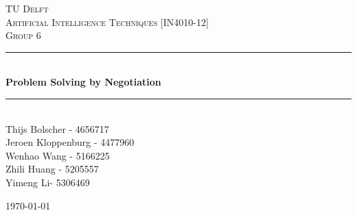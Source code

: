 \documentclass{article}
\newcommand{\divider}{\rule{\linewidth}{0.5mm}}
\begin{document}
    \begin{titlepage}
        \vfill
    
        \begin{center}
    		\textsc{\LARGE TU Delft}\\[1.5cm]
    		\textsc{\Large Artificial Intelligence Techniques [IN4010-12]}\\[0.5cm]
    		\textsc{\large Group 6}\\[0.5cm]
    		
    		\divider \\[0.4cm]
    		{ \huge \bfseries
    		    Problem Solving by Negotiation
    		}\\[0.4cm]
    		\divider \\[1.5cm]
    	
    	    \large
    		    Thijs Bolscher - 4656717\\
                Jeroen Kloppenburg - 4477960\\
                Wenhao Wang - 5166225\\
                Zhili Huang - 5205557\\
                Yimeng Li- 5306469
    		\vfill
    		
    		{\large \today}\\[3cm]
    	\end{center}
    \end{titlepage}

    
    \newpage
    
    
    
    
    \appendix
    
\end{document}
